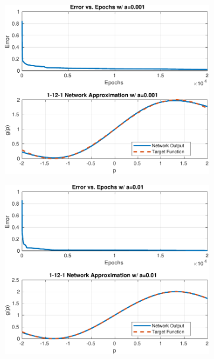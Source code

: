 \begin{figure}[htpb]
	\centering
	\begin{subfigure}{0.47\textwidth}
		\centering
		\includegraphics[width=\textwidth]{../Problem 4/nn_images/1-12-1_NN_a=0.001.pdf}
		\caption{}
	\end{subfigure}
	\hfill
	\begin{subfigure}{0.47\textwidth}
		\centering
		\includegraphics[width=\textwidth]{../Problem 4/nn_images/1-12-1_NN_a=0.01.pdf}
		\caption{}
	\end{subfigure}\\

\end{figure}
